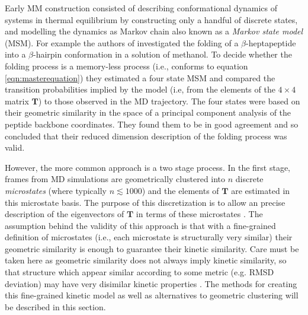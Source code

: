 Early MM construction consisted of describing conformational dynamics of systems in thermal equilibrium by constructing only a handful of discrete states, and modelling the dynamics as Markov chain also known as a \emph{Markov state model} (MSM). For example the authors of \cite{degrootEssentialDynamicsReversible2001} investigated the folding of a $\beta$-heptapeptide into a $\beta$-hairpin conformation in a solution of methanol.  To decide whether the folding process is a memory-less process (i.e., conforms to equation \ref{eqn:masterequation}) they estimated a four state MSM and compared the transition probabilities implied by the model (i.e, from the elements of the $4\times 4$ matrix $\mathbf{T}$) to those observed in the MD trajectory. The four states were based on their geometric similarity in the space of a principal component analysis of the peptide backbone coordinates. They found them to be in good agreement and so concluded that their reduced dimension description of the folding process was valid. 


However, the more common approach \cite{husicMarkovStateModels2018, noeMarkovModelsMolecular2019b} is a two stage process. In the first stage, frames from MD simulations are  geometrically clustered into $n$ discrete \emph{microstates} (where typically $n \lesssim 1000$) and the elements of $\mathbf{T}$ are estimated in this microstate basis. The purpose of this discretization is to allow an precise description of the eigenvectors of $\mathbf{T}$ in terms of these microstates \cite{perez-hernandezIdentificationSlowMolecular2013a}. The assumption behind the validity of this approach is that with a fine-grained definition of microstates (i.e., each microstate is structurally very similar) their geometric similarity is enough to guarantee their kinetic similarity.  Care must be taken here as geometric similarity does not always imply kinetic similarity, so that structure which appear similar according to some metric (e.g. RMSD deviation) may have very disimilar kinetic properties \cite{bowmanUsingGeneralizedEnsemble2009a, krivovHiddenComplexityFree2004, noeTransitionNetworksModeling2008, berezovskaAccountingKineticsOrder2012}. The methods for creating this fine-grained kinetic model as well as alternatives to geometric clustering will be described in this section.


